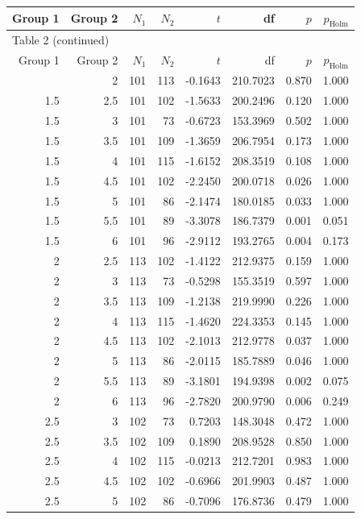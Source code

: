 \documentclass[11pt,a4paper]{article}
\begin{document}
\begin{longtable}{@{}rrrrrrrr@{}}
\toprule
Group 1 & Group 2 & $N_1$ & $N_2$ & $t$ & df & $p$ & $p_{\mathrm{Holm}}$\\
\midrule\endfirsthead
\multicolumn{8}{l}{Table 2 (continued)}\\
\toprule
Group 1 & Group 2 & $N_1$ & $N_2$ & $t$ & df & $p$ & $p_{\mathrm{Holm}}$\\
\midrule\endhead
\bottomrule\endfoot
1.5 & 2 & 101 & 113 & -0.1643 & 210.7023 & 0.870 & 1.000 \\
1.5 & 2.5 & 101 & 102 & -1.5633 & 200.2496 & 0.120 & 1.000 \\
1.5 & 3 & 101 & 73 & -0.6723 & 153.3969 & 0.502 & 1.000 \\
1.5 & 3.5 & 101 & 109 & -1.3659 & 206.7954 & 0.173 & 1.000 \\
1.5 & 4 & 101 & 115 & -1.6152 & 208.3519 & 0.108 & 1.000 \\
1.5 & 4.5 & 101 & 102 & -2.2450 & 200.0718 & 0.026 & 1.000 \\
1.5 & 5 & 101 & 86 & -2.1474 & 180.0185 & 0.033 & 1.000 \\
1.5 & 5.5 & 101 & 89 & -3.3078 & 186.7379 & 0.001 & 0.051 \\
1.5 & 6 & 101 & 96 & -2.9112 & 193.2765 & 0.004 & 0.173 \\
2 & 2.5 & 113 & 102 & -1.4122 & 212.9375 & 0.159 & 1.000 \\
2 & 3 & 113 & 73 & -0.5298 & 155.3519 & 0.597 & 1.000 \\
2 & 3.5 & 113 & 109 & -1.2138 & 219.9990 & 0.226 & 1.000 \\
2 & 4 & 113 & 115 & -1.4620 & 224.3353 & 0.145 & 1.000 \\
2 & 4.5 & 113 & 102 & -2.1013 & 212.9778 & 0.037 & 1.000 \\
2 & 5 & 113 & 86 & -2.0115 & 185.7889 & 0.046 & 1.000 \\
2 & 5.5 & 113 & 89 & -3.1801 & 194.9398 & 0.002 & 0.075 \\
2 & 6 & 113 & 96 & -2.7820 & 200.9790 & 0.006 & 0.249 \\
2.5 & 3 & 102 & 73 & 0.7203 & 148.3048 & 0.472 & 1.000 \\
2.5 & 3.5 & 102 & 109 & 0.1890 & 208.9528 & 0.850 & 1.000 \\
2.5 & 4 & 102 & 115 & -0.0213 & 212.7201 & 0.983 & 1.000 \\
2.5 & 4.5 & 102 & 102 & -0.6966 & 201.9903 & 0.487 & 1.000 \\
2.5 & 5 & 102 & 86 & -0.7096 & 176.8736 & 0.479 & 1.000 \\

\end{longtable}
\end{document}

